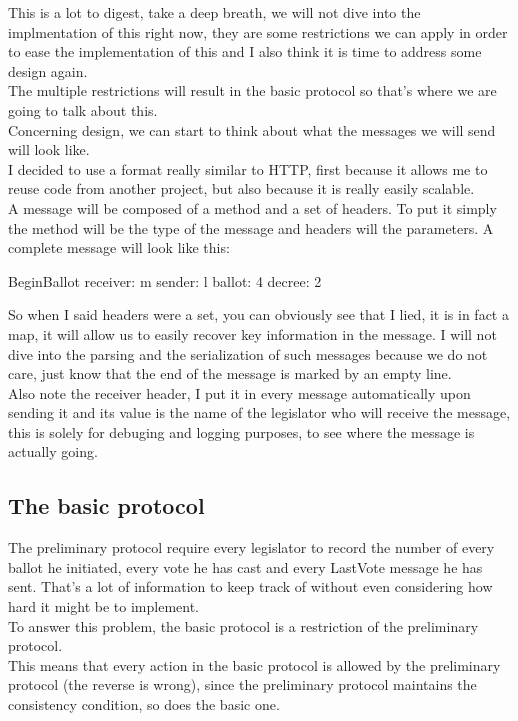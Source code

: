 \documentclass{article}
\begin{document}
This is a lot to digest, take a deep breath, we will not dive into the implmentation of this right now, they are some restrictions we can apply in order to ease the implementation of this and I also think it is time to address some design again.\\
The multiple restrictions will result in the basic protocol so that's where we are going to talk about this.\\
Concerning design, we can start to think about what the messages we will send will look like.\\
I decided to use a format really similar to HTTP, first because it allows me to reuse code from another project, but also because it is really easily scalable.\\
A message will be composed of a method and a set of headers. To put it simply the method will be the type of the message and headers will the parameters. A complete message will look like this:

\begin{shell}
BeginBallot
receiver: m
sender: l
ballot: 4
decree: 2

\end{shell}

So when I said headers were a set, you can obviously see that I lied, it is in fact a map, it will allow us to easily recover key information in the message. I will not dive into the parsing and the serialization of such messages because we do not care, just know that the end of the message is marked by an empty line.\\
Also note the receiver header, I put it in every message automatically upon sending it and its value is the name of the legislator who will receive the message, this is solely for debuging and logging purposes, to see where the message is actually going.

\pagebreak
\subsection{The basic protocol}
The preliminary protocol require every legislator to record the number of every ballot he initiated, every vote he has cast and every LastVote message he has sent. That's a lot of information to keep track of without even considering how hard it might be to implement.\\
To answer this problem, the basic protocol is a restriction of the preliminary protocol.\\
This means that every action in the basic protocol is allowed by the preliminary protocol (the reverse is wrong), since the preliminary protocol maintains the consistency condition, so does the basic one.
\end{document}
